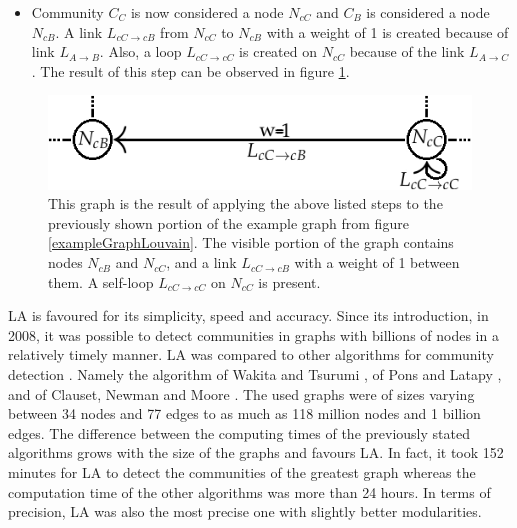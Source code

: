 \begin{enumerate}
  \begin{itemize}
    \item Community $C_{C}$ is now considered a node $N_{cC}$ and $C_{B}$ is considered a node $N_{cB}$. A link $L_{cC\rightarrow cB}$ from $N_{cC}$ to $N_{cB}$ with a weight of 1 is created because  of link $L_{A\rightarrow B}$. Also, a loop $L_{cC\rightarrow cC}$ is created on $N_{cC}$ because of the link $L_{A\rightarrow C}$. The result of this step can be observed in figure \ref{exampleGraphLouvainEnde}.
  \end{itemize}  
\begin{figure}[ht!]
  \centering
  \includegraphics[width=\textwidth]{Images/graphForCommunityEnde.png}
  \caption{This graph is the result of applying the above listed steps to the previously shown portion of the example graph from figure \ref{exampleGraphLouvain}. The visible portion of the graph contains nodes $N_{cB}$ and $N_{cC}$, and a link $L_{cC\rightarrow cB}$ with a weight of 1 between them. A self-loop $L_{cC\rightarrow cC}$ on $N_{cC}$ is present.}
  \label{exampleGraphLouvainEnde}
\end{figure} 
    
\end{enumerate}
LA is favoured for its simplicity, speed and accuracy. Since its introduction, in 2008, it was possible to detect communities in graphs with billions of nodes in a relatively timely manner. LA was compared to other algorithms for community detection \cite{louvainAlgorithm}.  Namely the algorithm of Wakita and Tsurumi \cite{wakitaAndToshiyuki}, of Pons and Latapy \cite{ponsAndLatapy}, and of Clauset, Newman and Moore \cite{CNM}. The used graphs were of sizes varying between 34 nodes and 77 edges to as much as 118 million nodes and 1 billion edges. The difference between the computing times of the previously stated algorithms grows with the size of the graphs and favours LA. In fact, it took 152 minutes for LA to detect the communities of the greatest graph whereas the computation time of the other algorithms was more than 24 hours. In terms of precision, LA was also the most precise one with slightly better modularities.

